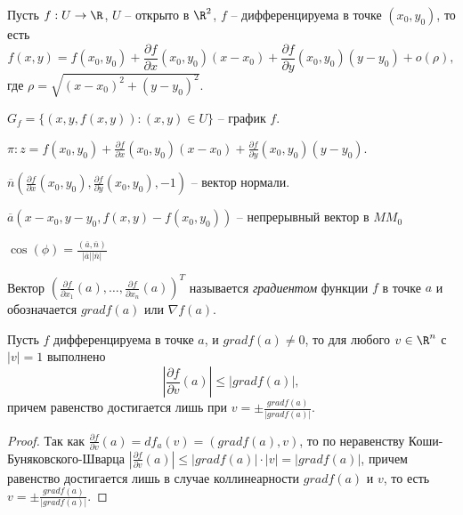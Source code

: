 
\begin{note}[Геометрический смысл дифференцируемости ($n = 2$)]

    Пусть $f: U \to \R$, $U$ -- открыто в $\R^{2}$, $f$ -- дифференцируема в точке $(x_{0}, y_{0})$, то есть 
    \[f(x, y) = f(x_{0}, y_{0}) + \frac{\partial f}{\partial x}(x_{0}, y_{0})(x - x_{0}) + \frac{\partial f}{\partial y}(x_{0}, y_{0})(y - y_{0}) + o(\rho),\]
    где $\rho = \sqrt{(x - x_{0})^{2} + (y - y_{0})^{2}}$.
    
    $G_{f} = \{(x, y, f(x, y)): (x, y) \in U\}$ -- график $f$.
    
    $\pi: z = f(x_{0}, y_{0}) + \frac{\partial f}{\partial x}(x_{0}, y_{0})(x - x_{0}) + \frac{\partial f}{\partial y}(x_{0}, y_{0})(y - y_{0})$.
    
    $\overline{n}(\frac{\partial f}{\partial x}(x_{0}, y_{0}), \frac{\partial f}{\partial y}(x_{0}, y_{0}), -1)$ -- вектор нормали.
    
    $\overline{a} (x - x_{0}, y - y_{0}, f(x, y) - f(x_{0}, y_{0}))$ -- непрерывный вектор в $MM_{0}$
    
    $\cos(\phi) = \frac{(\overline{a}, \overline{n})}{|\overline{a}||\overline{n}|}$
    
\end{note}

\begin{definition}
    Вектор $(\frac{\partial f}{\partial x_{1}}(a), \ldots, \frac{\partial f}{\partial x_{n}}(a))^{T}$ называется \textit{градиентом} функции $f$ в точке $a$ и обозначается $grad f(a)$ или $\nabla f(a)$.
\end{definition}

\begin{corollary}
    Пусть $f$ дифференцируема в точке $a$, и $grad f(a) \neq 0$, то для любого $v \in \R^{n}$ с $|v| = 1$ выполнено
    \[\left|\frac{\partial f}{\partial v}(a)\right| \leq |grad f(a)|,\]
    причем равенство достигается лишь при $v = \pm \frac{grad f(a)}{|grad f(a)|}$.
\end{corollary}

\begin{proof}
    Так как $\frac{\partial f}{\partial v}(a) = df_{a}(v) = (grad f(a), v)$, то по неравенству Коши-Буняковского-Шварца $\left|\frac{\partial f}{\partial v}(a)\right| \leq |grad f(a)| \cdot |v| = |grad f(a)|$, причем равенство достигается лишь в случае коллинеарности $grad f(a)$ и $v$, то есть $v = \pm \frac{grad f(a)}{|grad f(a)|}$.
\end{proof}

